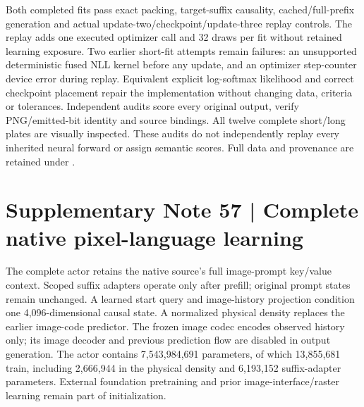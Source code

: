 \documentclass[10pt,a4paper]{article}
\begin{document}
Both completed fits pass exact packing, target-suffix causality,
cached/full-prefix generation and actual update-two/checkpoint/update-three
replay controls. The replay adds one executed optimizer call and 32 draws
per fit without retained learning exposure. Two earlier short-fit attempts
remain failures: an unsupported deterministic fused NLL kernel before any
update, and an optimizer step-counter device error during replay. Equivalent
explicit log-softmax likelihood and correct checkpoint placement repair the
implementation without changing data, criteria or tolerances. Independent
audits score every original output, verify PNG/emitted-bit identity and source
bindings. All twelve complete short/long plates are visually inspected.
These audits do not independently replay every inherited neural forward or
assign semantic scores. Full data and provenance are retained under
.

\clearpage
{}


\clearpage
\section*{Supplementary Note 57 | Complete native pixel-language learning}
\label{note:complete-pixel}
The complete actor retains the native source's full image-prompt key/value
context. Scoped suffix adapters operate only after prefill; original prompt
states remain unchanged. A learned start query and image-history projection
condition one 4,096-dimensional causal state. A normalized physical density
replaces the earlier image-code predictor. The frozen image codec encodes
observed history only; its image decoder and previous prediction flow are
disabled in output generation. The actor contains 7,543,984,691 parameters,
of which 13,855,681 train, including 2,666,944 in the physical density and
6,193,152 suffix-adapter parameters. External foundation pretraining and prior
image-interface/raster learning remain part of initialization.
\end{document}
